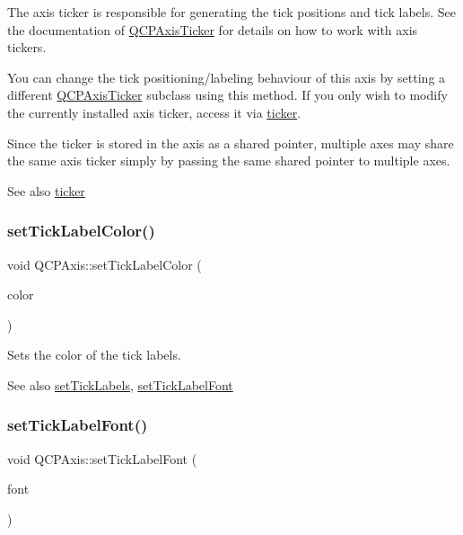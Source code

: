 The axis ticker is responsible for generating the tick positions and tick labels. See the documentation of \mbox{\hyperlink{class_q_c_p_axis_ticker}{Q\+C\+P\+Axis\+Ticker}} for details on how to work with axis tickers.

You can change the tick positioning/labeling behaviour of this axis by setting a different \mbox{\hyperlink{class_q_c_p_axis_ticker}{Q\+C\+P\+Axis\+Ticker}} subclass using this method. If you only wish to modify the currently installed axis ticker, access it via \mbox{\hyperlink{class_q_c_p_axis_a7b7a27151be8235059e1294f73ecf615}{ticker}}.

Since the ticker is stored in the axis as a shared pointer, multiple axes may share the same axis ticker simply by passing the same shared pointer to multiple axes.

\begin{DoxySeeAlso}{See also}
\mbox{\hyperlink{class_q_c_p_axis_a7b7a27151be8235059e1294f73ecf615}{ticker}} 
\end{DoxySeeAlso}
\mbox{\label{class_q_c_p_axis_a395e445c3fe496b935bee7b911ecfd1c}} 
\subsubsection{\texorpdfstring{setTickLabelColor()}{setTickLabelColor()}}
{\footnotesize\ttfamily void Q\+C\+P\+Axis\+::set\+Tick\+Label\+Color (\begin{DoxyParamCaption}\item[{const Q\+Color \&}]{color }\end{DoxyParamCaption})}

Sets the color of the tick labels.

\begin{DoxySeeAlso}{See also}
\mbox{\hyperlink{class_q_c_p_axis_a04ba16e1f6f78d70f938519576ed32c8}{set\+Tick\+Labels}}, \mbox{\hyperlink{class_q_c_p_axis_a2b8690c4e8dbc39d9185d2b398ce7a6c}{set\+Tick\+Label\+Font}} 
\end{DoxySeeAlso}
\mbox{\label{class_q_c_p_axis_a2b8690c4e8dbc39d9185d2b398ce7a6c}} 
\subsubsection{\texorpdfstring{setTickLabelFont()}{setTickLabelFont()}}
{\footnotesize\ttfamily void Q\+C\+P\+Axis\+::set\+Tick\+Label\+Font (\begin{DoxyParamCaption}\item[{const Q\+Font \&}]{font }\end{DoxyParamCaption})}

